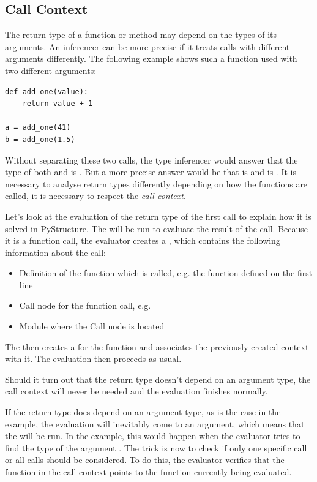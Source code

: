 \documentclass[12pt,halfparskip,DIV11,BCOR10mm]{scrreprt}
\begin{document}
\subsection{Call Context}

The return type of a function or method may depend on the types of its arguments. An inferencer can be more precise if it treats calls with different arguments differently. The following example shows such a function used with two different arguments:

\begin{lstlisting}
def add_one(value):
    return value + 1

a = add_one(41)
b = add_one(1.5)
\end{lstlisting}

Without separating these two calls, the type inferencer would answer that the type of both  and  is . But a more precise answer would be that  is  and  is . It is necessary to analyse return types differently depending on how the functions are called, it is necessary to respect the \emph{call context}.

Let's look at the evaluation of the return type of the first  call to explain how it is solved in PyStructure. The  will be run to evaluate the result of the call. Because it is a function call, the evaluator creates a , which contains the following information about the call:

\begin{itemize}
    \item Definition of the function which is called, e.g. the  function defined on the first line
    \item Call node for the function call, e.g. 
    \item Module where the Call node is located
\end{itemize}

The  then creates a  for the  function and associates the previously created context with it. The evaluation then proceeds as usual.

Should it turn out that the return type doesn't depend on an argument type, the call context will never be needed and the evaluation finishes normally.

If the return type does depend on an argument type, as is the case in the example, the evaluation will inevitably come to an argument, which means that the  will be run. In the example, this would happen when the evaluator tries to find the type of the argument . The trick is now to check if only one specific call or all calls should be considered. To do this, the evaluator verifies that the function in the call context points to the function currently being evaluated.
\end{document}
